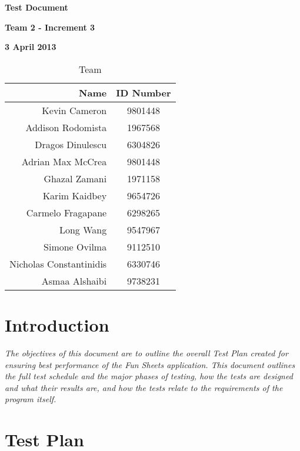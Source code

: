 \documentclass[12pt]{article}
\begin{document}
\vspace*{0.5in}
\centerline{\bf\Large Test Document}

\vspace*{0.5in}
\centerline{\bf\Large Team 2 - Increment 3}

\vspace*{0.5in}
\centerline{\bf\Large 3 April 2013}

\vspace*{1.5in}
\begin{table}[htbp]
\caption{Team}
\begin{center}
\begin{tabular}{|r | c|}
\hline
Name & ID Number \\\hline\hline
Kevin Cameron & 9801448 \\\hline\hline
Addison Rodomista & 1967568 \\\hline\hline
Dragos Dinulescu & 6304826 \\\hline\hline
Adrian Max McCrea & 9801448 \\\hline\hline
Ghazal Zamani & 1971158 \\\hline\hline
Karim Kaidbey & 9654726 \\\hline\hline
Carmelo Fragapane & 6298265 \\\hline\hline
Long Wang & 9547967 \\\hline\hline
Simone Ovilma & 9112510 \\\hline\hline
Nicholas Constantinidis & 6330746 \\\hline\hline
Asmaa Alshaibi & 9738231 \\\hline
\end{tabular}
\end{center}
\end{table}

\clearpage


\printindex
\clearpage


\section{Introduction}

{\it
The objectives of this document are to outline the overall Test Plan created for ensuring best performance of the Fun Sheets application. This document outlines the full test schedule and the major phases of testing, how the tests are designed and what their results are, and how the tests relate to the requirements of the program itself. 
}
\section{Test Plan}
\end{document}
